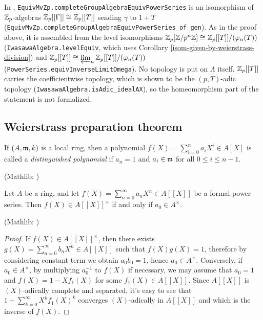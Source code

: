 \begin{remark}
In {\Lean}, \texttt{EquivMvZp.completeGroupAlgebraEquivPowerSeries} is an
isomorphism of ${\mathbb {Z}}_p$-algebras ${\mathbb {Z}}_p[[\Gamma]]\cong{\mathbb {Z}}_p[[T]]$ sending
$\gamma$ to $1+T$
(\texttt{EquivMvZp.completeGroupAlgebraEquivPowerSeries\_of\_gen}). As in the
proof above, it is assembled from the level isomorphisms
${\mathbb {Z}}_p[{\mathbb {Z}}/p^n{\mathbb {Z}}]\cong{\mathbb {Z}}_p[[T]]/(\varphi_n(T))$
(\texttt{IwasawaAlgebra.levelEquiv}, which uses Corollary
\ref{isom-given-by-weierstrass-division}) and
${\mathbb {Z}}_p[[T]]\cong\varprojlim_n{\mathbb {Z}}_p[[T]]/(\varphi_n(T))$
(\texttt{PowerSeries.equivInverseLimitOmega}). No topology is put on $\Lambda$
itself. ${\mathbb {Z}}_p[[T]]$ carries the coefficientwise topology, which is shown to be
the $(p,T)$-adic topology (\texttt{IwasawaAlgebra.isAdic\_idealAX}), so the
homeomorphism part of the statement is not formalized.
\end{remark}

\subsection{Weierstrass preparation theorem}

\begin{definition}
\label{distinguished-polynomial}
\leanok
If $(A,{\mathfrak{m}},k)$ is a local ring, then a polynomial $f(X)=\sum_{i=0}^na_iX^i\in A[X]$
is called a \emph{distinguished polynomial}
if $a_n=1$ and $a_i\in{\mathfrak{m}}$ for all $0\leq i\leq n-1$.

(Mathlib: )
\end{definition}

\begin{prop}
\label{power-series-invertible-iff}
\leanok
Let $A$ be a ring, and let $f(X)=\sum_{n=0}^\infty a_nX^n\in A[[X]]$
be a formal power series.
Then $f(X)\in A[[X]]^\times$ if and only if $a_0\in A^\times$.

(Mathlib: )
\end{prop}

\begin{proof}
\leanok
If $f(X)\in A[[X]]^\times$,
then there exists $g(X)=\sum_{n=0}^\infty b_nX^n\in A[[X]]$
such that $f(X)g(X)=1$, therefore by considering constant term we obtain
$a_0b_0=1$, hence $a_0\in A^\times$.
Conversely, if $a_0\in A^\times$, by multiplying $a_0^{-1}$ to $f(X)$
if necessary, we may assume that $a_0=1$
and $f(X)=1-Xf_1(X)$ for some $f_1(X)\in A[[X]]$.
Since $A[[X]]$ is $(X)$-adically complete and separated,
it's easy to see that $1+\sum_{k=0}^\infty X^kf_1(X)^k$
converges $(X)$-adically in $A[[X]]$ and which is the inverse of
$f(X)$.
\end{proof}

